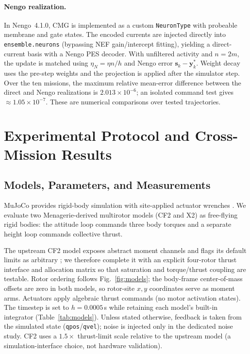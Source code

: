\documentclass[letterpaper, 10 pt, conference]{ieeeconf}
\begin{document}
\paragraph{Nengo realization.}
In Nengo~4.1.0, CMG is implemented as a custom \texttt{NeuronType} with probeable membrane and gate states. The encoded currents are injected directly into \texttt{ensemble.neurons} (bypassing NEF gain/intercept fitting), yielding a direct-current basis with a Nengo PES decoder. With unfiltered activity and $n=2m$, the update is matched using $\eta_N=\eta n/h$ and Nengo error $\bm s_k-\bm y_k^*$. Weight decay uses the pre-step weights and the projection is applied after the simulator step. Over the ten missions, the maximum relative mean-error difference between the direct and Nengo realizations is $2.013\times10^{-6}$; an isolated command test gives $\approx1.05\times10^{-7}$. These are numerical comparisons over tested trajectories.

\section{Experimental Protocol and Cross-Mission Results}
\label{sec:results}
\subsection{Models, Parameters, and Measurements}
MuJoCo provides rigid-body simulation with site-applied actuator wrenches \cite{todorov2012mujoco}. We evaluate two Menagerie-derived multirotor models \cite{menagerieModels} (CF2 and X2) as free-flying rigid bodies: the attitude loop commands three body torques and a separate height loop commands collective thrust.

The upstream CF2 model exposes abstract moment channels and flags its default limits as arbitrary \cite{menagerieCF2}; we therefore complete it with an explicit four-rotor thrust interface and allocation matrix so that saturation and torque/thrust coupling are testable. Rotor ordering follows Fig.~\ref{fig:models}; the body-frame center-of-mass offsets are zero in both models, so rotor-site $x,y$ coordinates serve as moment arms. Actuators apply algebraic thrust commands (no motor activation states). The timestep is set to $h=0.0005$\,s while retaining each model's built-in integrator (Table~\ref{tab:models}). Unless stated otherwise, feedback is taken from the simulated state (\texttt{qpos}/\texttt{qvel}); noise is injected only in the dedicated noise study. CF2 uses a $1.5\times$ thrust-limit scale relative to the upstream model (a simulation-interface choice, not hardware validation).
\end{document}
